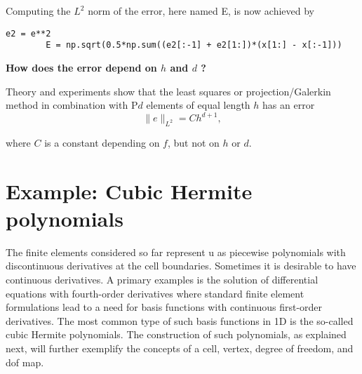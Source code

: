 \documentclass[../main.tex]{subfiles}
\begin{document}
	Computing the $L^{2}$ norm of the error, here named E, is now achieved by
	\begin{lstlisting}[numbers=none]
		e2 = e**2
		E = np.sqrt(0.5*np.sum((e2[:-1] + e2[1:])*(x[1:] - x[:-1]))	
	\end{lstlisting}
	\begin{mybox}
		\textbf{How does the error depend on $h$ and $d$ ?}
		
		\noindent Theory and experiments show that the least squares or projection/Galerkin method in combination with $\mathrm{P} d$ elements of equal length $h$ has an error
		\begin{equation}\label{eqa93}
			\|e\|_{L^{2}}=C h^{d+1},
		\end{equation}
		
		\noindent where $C$ is a constant depending on $f$, but not on $h$ or $d$.
	\end{mybox}
	
	\section[Example: Cubic Hermite polynomials]{Example: Cubic Hermite polynomials}
	\label{sec:sec_6_5}
	The finite elements considered so far represent u as piecewise polynomials with
	discontinuous derivatives at the cell boundaries. Sometimes it is desirable to
	have continuous derivatives. A primary examples is the solution of differential
	equations with fourth-order derivatives where standard finite element formulations lead to a need for basis functions with continuous first-order derivatives.
	The most common type of such basis functions in 1D is the so-called cubic
	Hermite polynomials. The construction of such polynomials, as explained next,
	will further exemplify the concepts of a cell, vertex, degree of freedom, and dof
	map.
	
\end{document}
